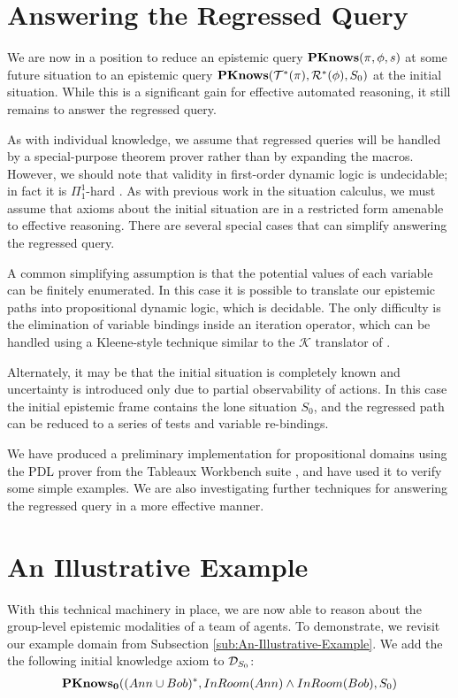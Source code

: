 \section{Answering the Regressed Query}

We are now in a position to reduce an epistemic query $\mathbf{PKnows}(\pi,\phi,s)$
at some future situation to an epistemic query $\mathbf{PKnows}(\mathcal{T}^{*}(\pi),\mathcal{R}^{*}(\phi),S_{0})$
at the initial situation. While this is a significant gain for effective
automated reasoning, it still remains to answer the regressed query.

As with individual knowledge, we assume that regressed queries will
be handled by a special-purpose theorem prover rather than by expanding
the macros. However, we should note that validity in first-order dynamic
logic is undecidable; in fact it is $\Pi_{1}^{1}$-hard \citep{kooi07dyn_termmodal_logic}.
As with previous work in the situation calculus, we must assume that
axioms about the initial situation are in a restricted form amenable
to effective reasoning. There are several special cases that can simplify
answering the regressed query.

A common simplifying assumption is that the potential values of each
variable can be finitely enumerated. In this case it is possible to
translate our epistemic paths into propositional dynamic logic, which
is decidable. The only difficulty is the elimination of variable bindings
inside an iteration operator, which can be handled using a Kleene-style
technique similar to the $\mathcal{K}$ translator of \citet{vanBenthem06lcc}.

Alternately, it may be that the initial situation is completely known
and uncertainty is introduced only due to partial observability of
actions. In this case the initial epistemic frame contains the lone
situation $S_{0}$, and the regressed path can be reduced to a series
of tests and variable re-bindings.

We have produced a preliminary implementation for propositional domains
using the PDL prover from the Tableaux Workbench suite \citep{abate07twb_pdl},
and have used it to verify some simple examples. We are also investigating
further techniques for answering the regressed query in a more effective
manner.


\section{An Illustrative Example}

With this technical machinery in place, we are now able to reason
about the group-level epistemic modalities of a team of agents. To
demonstrate, we revisit our example domain from Subsection \ref{sub:An-Illustrative-Example}.
We add the the following initial knowledge axiom to $\mathcal{D}_{S_{0}}$:\begin{gather*}
\mathbf{PKnows_{0}}((Ann\cup Bob)^{*},InRoom(Ann)\wedge InRoom(Bob),S_{0})\end{gather*}


